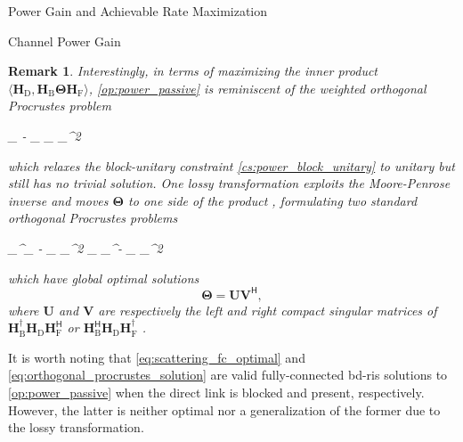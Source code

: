\documentclass[journal]{IEEEtran}
\newtheorem{remark}{Remark}
\begin{document}
\begin{section}{Power Gain and Achievable Rate Maximization}
\begin{subsection}{Channel Power Gain}
		\begin{remark}
			Interestingly, in terms of maximizing the inner product $\langle \mathbf{H}_\mathrm{D}, \mathbf{H}_\mathrm{B} \mathbf{\Theta} \mathbf{H}_\mathrm{F} \rangle$, \eqref{op:power_passive} is reminiscent of the weighted orthogonal Procrustes problem \cite{Gower2004}
			\begin{mini!}
				{\scriptstyle{\mathbf{\Theta}}}{\lVert {}_ - _ \mathbf{\Theta} _\mathrm{F} \rVert _^2}{\label{op:weighted_orthogonal_procrustes}}{}
			\end{mini!}
			which relaxes the block-unitary constraint \eqref{cs:power_block_unitary} to unitary but still has no trivial solution.
			One lossy transformation exploits the Moore-Penrose inverse and moves $\mathbf{\Theta}$ to one side of the product \cite{Bell2003}, formulating two standard orthogonal Procrustes problems
			\begin{mini!}
				{\scriptstyle{\mathbf{\Theta}}}{\lVert {}_^\dagger {}_ - \mathbf{\Theta} _\mathrm{F} \rVert _^2  \lVert \mathbf{H}_ _^\dagger - _ \mathbf{\Theta} \rVert _^2}{\label{op:standard_orthogonal_procrustes}}{}
				\addConstraint{\mathbf{\Theta}^\mathsf{H} \mathbf{\Theta}=\mathbf{I},}{}{}
			\end{mini!}
			which have global optimal solutions
			\begin{equation}
				\mathbf{\Theta} = \mathbf{U} \mathbf{V}^\mathsf{H},
				\label{eq:orthogonal_procrustes_solution}
			\end{equation}
			where $\mathbf{U}$ and $\mathbf{V}$ are respectively the left and right compact singular matrices of $\mathbf{H}_\mathrm{B}^\dagger \mathbf{H}_\mathrm{D} \mathbf{H}_\mathrm{F}^\mathsf{H}$ or $\mathbf{H}_\mathrm{B}^\mathsf{H} \mathbf{H}_\mathrm{D} \mathbf{H}_\mathrm{F}^\dagger$ \cite{Golub2013}.
		\end{remark}

		It is worth noting that \eqref{eq:scattering_fc_optimal} and \eqref{eq:orthogonal_procrustes_solution} are valid fully-connected \gls{bd}-\gls{ris} solutions to \eqref{op:power_passive} when the direct link is blocked and present, respectively.
		However, the latter is neither optimal nor a generalization of the former due to the lossy transformation.


\end{subsection}
\end{section}
\end{document}

